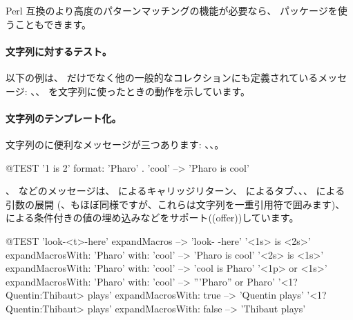 \documentclass[a4paper,10pt,twoside]{book}
\begin{document}
Perl 互換のより高度のパターンマッチングの機能が必要なら、 パッケージを使うこともできます。

\paragraph{文字列に対するテスト。} 以下の例は、 だけでなく他の一般的なコレクションにも定義されているメッセージ: 、、 を文字列に使ったときの動作を示しています。


\paragraph{文字列のテンプレート化。}
文字列のに便利なメッセージが三つあります: 、、。

\begin{code}{@TEST}
'{1} is {2}' format: {'Pharo' . 'cool'}  --> 'Pharo is cool'
\end{code}

、 などのメッセージは、 によるキャリッジリターン、 によるタブ、、、 による引数の展開 (、もほぼ同様ですが、これらは文字列を一重引用符で囲みます)、 による条件付きの値の埋め込みなどをサポート((offer))しています。

\begin{code}{@TEST}
'look-<t>-here' expandMacros                                         --> 'look-	-here'
'<1s> is <2s>' expandMacrosWith: 'Pharo' with: 'cool'   --> 'Pharo is cool'
'<2s> is <1s>' expandMacrosWith: 'Pharo' with: 'cool'   --> 'cool is Pharo'
'<1p> or <1s>' expandMacrosWith: 'Pharo' with: 'cool'  --> '''Pharo'' or Pharo'
'<1?Quentin:Thibaut> plays' expandMacrosWith: true     --> 'Quentin plays'
'<1?Quentin:Thibaut> plays' expandMacrosWith: false    --> 'Thibaut plays'
\end{code}
\end{document}
